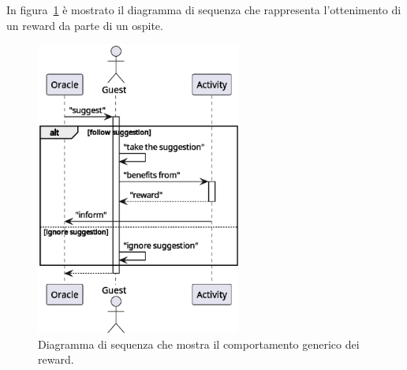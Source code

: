 \newpage

In figura~\ref{fig:reward} è mostrato il diagramma di sequenza che rappresenta l'ottenimento di un reward da parte di un ospite.

\begin{figure}[H]
    \centering
    \includegraphics[width=0.6\textwidth]{./img/reward-0}
    \caption{Diagramma di sequenza che mostra il comportamento generico dei reward.}
    \label{fig:reward}
\end{figure}

\newpage
